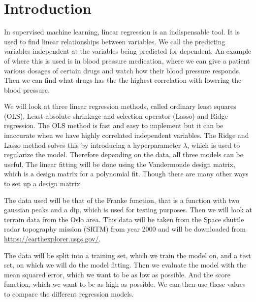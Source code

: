 \section{Introduction}
In supervised machine learning, linear regression is an indispensable tool. It is used to find linear relationships between variables. We call the predicting variables independent at the variables being predicted for dependent. An example of where this is used is in blood pressure medication, where we can give a patient various dosages of certain drugs and watch how their blood pressure responds. Then we can find what drugs has the the highest correlation with lowering the blood pressure. 

We will look at three linear regression methods, called ordinary least squares (OLS), Least absolute shrinkage and selection operator (Lasso) and Ridge regression. The OLS method is fast and easy to implement but it can be inaccurate when we have highly correlated independent variables. The Ridge and Lasso method solves this by introducing a hyperparameter $\lambda$, which is used to regularize the model. Therefore depending on the data, all three models can be useful. The linear fitting will be done using the Vandermonde design matrix, which is a design matrix for a polynomial fit. Though there are many other ways to set up a design matrix.

The data used will be that of the Franke function, that is a function with two gaussian peaks and a dip, which is used for testing purposes. Then we will look at terrain data from the Oslo area. This data will be taken from the Space shuttle radar topography mission (SRTM) from year 2000 and will be downloaded from \href{https://earthexplorer.usgs.gov/}{https://earthexplorer.usgs.gov/}.

The data will be split into a training set, which we train the model on, and a test set, on which we will do the model fitting. Then we evaluate the model with the mean squared error, which we want to be as low as possible. And the score function, which we want to be as high as possible. We can then use these values to compare the different regression models.


